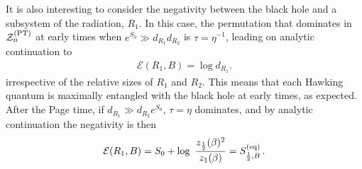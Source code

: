 \documentclass[a4paper,11pt]{article}
\newcommand\sZ{{\mathcal Z}}
\begin{document}
\begin{enumerate}
\begin{appendix}
It is also interesting to consider the negativity between the black hole and a subsystem of the radiation, $R_1$. In this case, the permutation that dominates in $\sZ_n^{\rm (PT)}$ at early times when $e^{S_0} \gg d_{R_1} d_{R_2}$ is 
$\tau = \eta^{-1}$, leading on analytic continuation to 
\begin{align}
 \mathcal{E}(R_1, B) = \log d_{R_1}.
\end{align}
irrespective of the relative sizes of $R_1$ and $R_2$. This means that each Hawking quantum is maximally entangled with the black hole at early times, as expected. After the Page time, if $d_{R_1} \gg d_{R_2}e^{S_0}$, $\tau = \eta$ dominates, and by analytic continuation the 
negativity is then
\begin{align}
 \mathcal{E}(R_1, B) = S_0 + \log\ \frac{z_{\frac{1}{2}}(\beta)^2}{z_1(\beta)} = S^{\rm (eq)}_{\frac{1}{2}, B}\, .
\end{align}

\end{appendix}
\end{enumerate}
\end{document}
